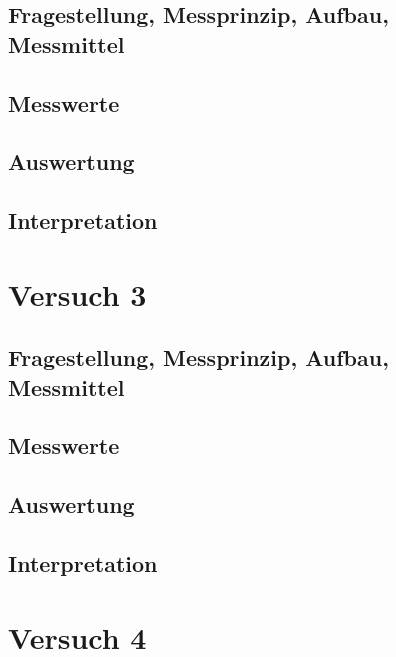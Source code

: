 \documentclass[12pt, oneside, a4paper, \docLanguage]{report}
\begin{document}
\section{Fragestellung, Messprinzip, Aufbau, Messmittel}
\label{chap:VERSUCH_2_FRAGESTELLUNG}

\section{Messwerte}
\label{chap:VERSUCH_2_MESSWERTE}

\section{Auswertung}
\label{chap:VERSUCH_2_AUSWERTUNG}

\section{Interpretation}
\label{chap:VERSUCH_2_INTERPRETATION}

%
%
\chapter{Versuch 3}
\label{chap:VERSUCH_3}

\section{Fragestellung, Messprinzip, Aufbau, Messmittel}
\label{chap:VERSUCH_3_FRAGESTELLUNG}

\section{Messwerte}
\label{chap:VERSUCH_3_MESSWERTE}

\section{Auswertung}
\label{chap:VERSUCH_3_AUSWERTUNG}

\section{Interpretation}
\label{chap:VERSUCH_3_INTERPRETATION}

%
%
\chapter{Versuch 4}
\label{chap:VERSUCH_4}
\end{document}
